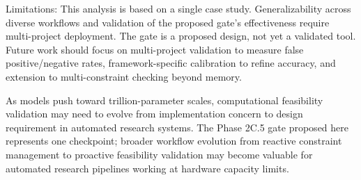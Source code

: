 Limitations: This analysis is based on a single case study. Generalizability across diverse workflows and validation of the proposed gate's effectiveness require multi-project deployment. The gate is a proposed design, not yet a validated tool. Future work should focus on multi-project validation to measure false positive/negative rates, framework-specific calibration to refine accuracy, and extension to multi-constraint checking beyond memory.

As models push toward trillion-parameter scales, computational feasibility validation may need to evolve from implementation concern to design requirement in automated research systems. The Phase 2C.5 gate proposed here represents one checkpoint; broader workflow evolution from reactive constraint management to proactive feasibility validation may become valuable for automated research pipelines working at hardware capacity limits.
